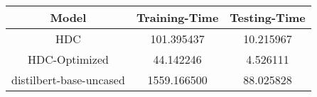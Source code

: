 \begin{tabular}{ccc}
\toprule
Model & Training-Time & Testing-Time \\
\midrule
HDC & 101.395437 & 10.215967 \\
HDC-Optimized & 44.142246 & 4.526111 \\
distilbert-base-uncased & 1559.166500 & 88.025828 \\
\bottomrule
\end{tabular}
